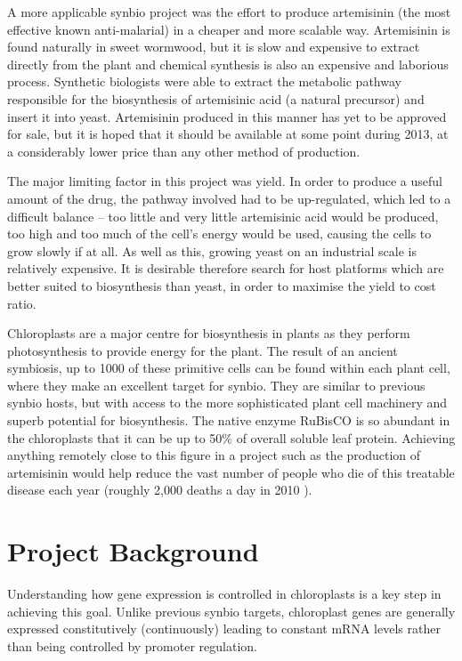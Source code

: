 \documentclass[twoside,a4paper]{article}
\begin{document}
\begin{multicols}{2}
A more applicable synbio project was the effort to produce 
artemisinin (the most effective known anti-malarial) in a cheaper and more 
scalable way.
Artemisinin is found naturally in sweet wormwood, but it is slow and expensive
to extract directly from the plant and chemical synthesis is also an expensive
and laborious process.
Synthetic biologists were able to extract the metabolic pathway responsible for
the biosynthesis of artemisinic acid (a natural precursor) and insert it into 
yeast\cite{yeast}.
Artemisinin produced in this manner has yet to be approved for sale, but it is
hoped that it should be available at some point during 2013, at a considerably
lower price than any other method of production.

The major limiting factor in this project was yield.
In order to produce a useful amount of the drug, the pathway involved had to be
up-regulated, which led to a difficult balance -- too little and very little
artemisinic acid would be produced, too high and too much of the cell's
energy would be used, causing the cells to grow slowly if at all.
As well as this, growing yeast on an industrial scale is relatively expensive.
It is desirable therefore search for host platforms which are better suited to
biosynthesis than yeast, in order to maximise the yield to cost ratio.

Chloroplasts are a major centre for biosynthesis in plants as they perform
photosynthesis to provide energy for the plant.
The result of an ancient symbiosis, up to 1000 of these primitive cells can be 
found within each plant cell, where they make an excellent target for synbio.
They are similar to previous synbio hosts, but with access to the more
sophisticated plant cell machinery and superb potential for biosynthesis.
The native enzyme RuBisCO is so abundant in the chloroplasts that it 
can be up to 50\% of overall soluble leaf protein.
Achieving anything remotely close to this figure in a project such as the
production of artemisinin would help reduce the vast number of people who die 
of this treatable disease each year (roughly 2,000 deaths a day in 2010
\cite{malaria}).


\section{Project Background}

Understanding how gene expression is controlled in chloroplasts is a key step
in achieving this goal.
Unlike previous synbio targets, chloroplast genes are generally expressed
constitutively (continuously) leading to constant mRNA levels rather than 
being controlled by promoter regulation\cite{Sugita1996}.


\end{multicols}
\end{document}
